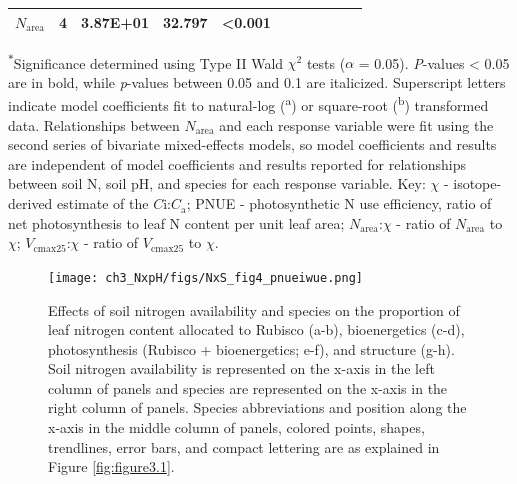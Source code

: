 \begin{landscape}
\begin{table}
{\begin{tabular}{p{2.5cm}p{0.5cm}p{2cm}p{1.5cm}p{1.5cm}p{2cm}p{1.5cm}p{1.5cm}p{2cm}p{1.5cm}p{1.5cm}}
        $N_\mathrm{area}$ & \multicolumn{1}{r}{4}
        & \multicolumn{1}{r}{3.87E+01} & \multicolumn{1}{r}{32.797} & \multicolumn{1}{r}{\textbf{<0.001}}
        &&&&&
        \\
        \hline
    \end{tabular}}
    \label{tab:table3.4}
    \end{table}
\begin{singlespace}
    \textsuperscript{$*$}Significance determined using Type II Wald $\chi^{2}$ tests ($\alpha$ = 0.05). \textit{P}-values < 0.05 are in bold, while \textit{p}-values between 0.05 and 0.1 are italicized. Superscript letters indicate model coefficients fit to natural-log (\textsuperscript{a}) or square-root (\textsuperscript{b}) transformed data. Relationships between $N_\mathrm{area}$ and each response variable were fit using the second series of bivariate mixed-effects models, so model coefficients and results are independent of model coefficients and results reported for relationships between soil N, soil pH, and species for each response variable. Key: $\chi$ - isotope-derived estimate of the $C\mathrm{i}$:$C_\mathrm{a}$; PNUE - photosynthetic N use efficiency, ratio of net photosynthesis to leaf N content per unit leaf area; $N_\mathrm{area}$:$\chi$ - ratio of $N_\mathrm{area}$ to $\chi$; $V_\mathrm{cmax25}$:$\chi$ - ratio of $V_\mathrm{cmax25}$ to $\chi$.
\end{singlespace}
\end{landscape}
\clearpage

\newpage
\begin{figure}
    \texttt{[image: ch3\_NxpH/figs/NxS\_fig4\_pnueiwue.png]}
    \centering
    \caption[Effects of soil N availability, species, and leaf N content on tradeoffs between nitrogen and water use]{Effects of soil nitrogen availability and species on the proportion of leaf nitrogen content allocated to Rubisco (a-b), bioenergetics (c-d), photosynthesis (Rubisco + bioenergetics; e-f), and structure (g-h). Soil nitrogen availability is represented on the x-axis in the left column of panels and species are represented on the x-axis in the right column of panels. Species abbreviations and position along the x-axis in the middle column of panels, colored points, shapes, trendlines, error bars, and compact lettering are as explained in Figure \ref{fig:figure3.1}.}
    \label{fig:figure3.4}
\end{figure}
\clearpage

